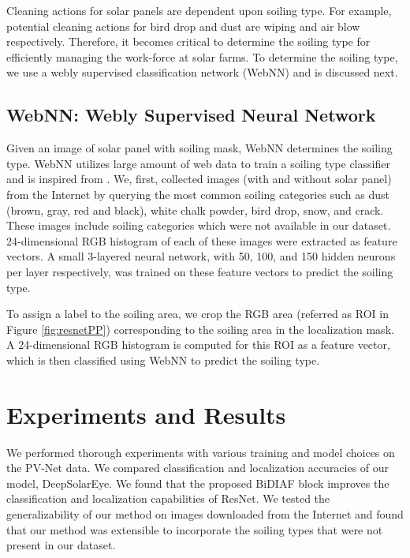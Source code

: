 \documentclass[10pt,twocolumn,letterpaper]{article}
\begin{document}
Cleaning actions for solar panels are dependent upon soiling type. For example, potential cleaning actions for bird drop and dust are wiping and air blow respectively. Therefore, it becomes critical to determine the soiling type for efficiently managing the work-force at solar farms. To determine the soiling type, we use a webly supervised classification network (WebNN) and is discussed next.

\subsection{WebNN: Webly Supervised Neural Network}
Given an image of solar panel with soiling mask, WebNN determines the soiling type. WebNN utilizes large amount of web data to train a soiling type classifier and is inspired from \cite{chen2015webly}. We, first, collected images (with and without solar panel) from the Internet by querying the most common soiling categories such as dust (brown, gray, red and black), white chalk powder, bird drop, snow, and crack. These images include soiling categories which were not available in our dataset. 24-dimensional RGB histogram of each of these images were extracted as feature vectors. A small 3-layered neural network, with 50, 100, and 150 hidden neurons per layer respectively, was trained on these feature vectors to predict the soiling type.

To assign a label to the soiling area, we crop the RGB area (referred as ROI in Figure \ref{fig:resnetPP}) corresponding to the soiling area in the localization mask. A 24-dimensional RGB histogram is computed for this ROI as a feature vector, which is then classified using WebNN to predict the soiling type. 

\vspace{-2mm}
\section{Experiments and Results}
\vspace{-2mm}
We performed thorough experiments with various training and model choices on the PV-Net data. We compared classification and localization accuracies of our model, DeepSolarEye. We found that the proposed BiDIAF block improves the classification and localization capabilities of ResNet. We tested the generalizability of our method on images downloaded from the Internet and found that our method was extensible to incorporate the soiling types that were not present in our dataset.
\end{document}
